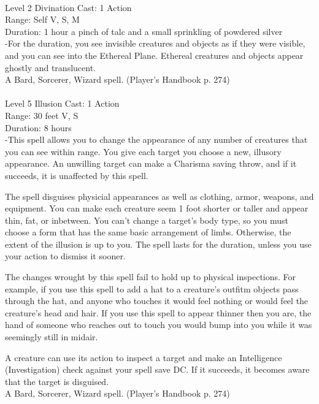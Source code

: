 \documentclass[10pt,twocolumn]{report}
\begin{document}
 \\
Level 2 \quad Divination \quad Cast: 1 Action\\
Range: Self \quad V, S, M\\
Duration: 1 hour \quad a pinch of talc and a small sprinkling of powdered silver\\
-For the duration, you see invisible creatures and objects as if they were visible, and you can see into the Ethereal Plane. Ethereal creatures and objects appear ghostly and translucent.\\
A Bard, Sorcerer, Wizard spell. (Player's Handbook p. 274) \\


 \\
Level 5 \quad Illusion \quad Cast: 1 Action\\
Range: 30 feet \quad V, S\\
Duration: 8 hours \quad \\
-This spell allows you to change the appearance of any number of creatures that you can see within range.
You give each target you choose a new, illusory appearance. An unwilling target can make a Charisma saving throw, and if it succeeds, it is unaffected by this spell.

The spell disguises physicial appearances as well as clothing, armor, weapons, and equipment. You can make each creature seem 1 foot shorter or taller and appear thin, fat, or inbetween. You can’t change a target’s body type, so you must choose a form that has the same basic arrangement of limbs. Otherwise, the extent of the illusion is up to you. The spell lasts for the duration, unless you use your action to dismiss it sooner.

The changes wrought by this spell fail to hold up to physical inspections. For example, if you use this spell to add a hat to a creature’s outfitm objects pass through the hat, and anyone who touches it would feel nothing or would feel the creature’s head and hair. If you use this spell to appear thinner then you are, the hand of someone who reaches out to touch you would bump into you while it was seemingly still in midair.

A creature can use its action to inspect a target and make an Intelligence (Investigation) check against your spell save DC. If it succeeds, it becomes aware that the target is disguised.\\
A Bard, Sorcerer, Wizard spell. (Player's Handbook p. 274) \\
\end{document}
